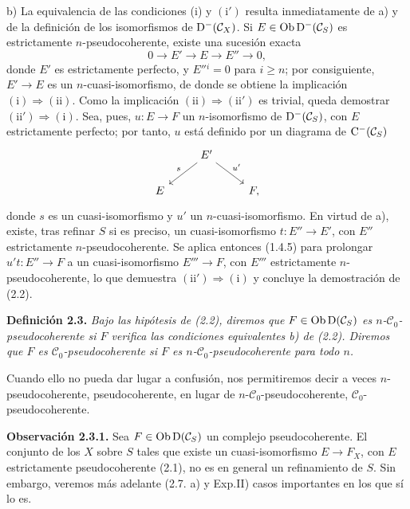 b) La equivalencia de las condiciones (i) y \((\mathrm{i}')\) resulta inmediatamente de a) y de la definición de los isomorfismos de \(\mathrm D^-(\mathcal C_X)\). Si \(E\in\operatorname{Ob}\mathrm D^-(\mathcal C_S)\) es estrictamente \(n\)-pseudocoherente, existe una sucesión exacta
\[
  0\longrightarrow E'\longrightarrow E\longrightarrow E''\longrightarrow 0,
\]
donde \(E'\) es estrictamente perfecto, y \(E''{}^i=0\) para \(i\geq n\); por consiguiente, \(E'\to E\) es un \(n\)-cuasi-isomorfismo, de donde se obtiene la implicación \((\mathrm{i})\Rightarrow(\mathrm{ii})\). Como la implicación \((\mathrm{ii})\Rightarrow(\mathrm{ii}')\) es trivial, queda demostrar \((\mathrm{ii}')\Rightarrow(\mathrm{i})\). Sea, pues, \(u:E\longrightarrow F\) un \(n\)-isomorfismo de \(\mathrm D^-(\mathcal C_S)\), con \(E\) estrictamente perfecto; por tanto, \(u\) está definido por un diagrama de \(\mathrm C^-(\mathcal C_S)\)
\[
\begin{tikzcd}
& E' \arrow[dl,"s"'] \arrow[dr,"u'"]\\
E && F ,
\end{tikzcd}
\]
donde \(s\) es un cuasi-isomorfismo y \(u'\) un \(n\)-cuasi-isomorfismo. En virtud de a), existe, tras refinar \(S\) si es preciso, un cuasi-isomorfismo \(t:E''\longrightarrow E'\), con \(E''\) estrictamente \(n\)-pseudocoherente. Se aplica entonces (1.4.5) para prolongar \(u't:E''\to F\) a un cuasi-isomorfismo \(E'''\longrightarrow F\), con \(E'''\) estrictamente \(n\)-pseudocoherente, lo que demuestra \((\mathrm{ii}')\Rightarrow(\mathrm{i})\) y concluye la demostración de (2.2).

\textbf{Definición 2.3.} \emph{Bajo las hipótesis de (2.2), diremos que \(F\in\operatorname{Ob}\mathrm D(\mathcal C_S)\) es \(n\)-\(\mathcal C_0\)-pseudocoherente si \(F\) verifica las condiciones equivalentes b) de (2.2). Diremos que \(F\) es \(\mathcal C_0\)-pseudocoherente si \(F\) es \(n\)-\(\mathcal C_0\)-pseudocoherente para todo \(n\).}

Cuando ello no pueda dar lugar a confusión, nos permitiremos decir a veces \(n\)-pseudocoherente, pseudocoherente, en lugar de \(n\)-\(\mathcal C_0\)-pseudocoherente, \(\mathcal C_0\)-pseudocoherente.

\textbf{Observación 2.3.1.} Sea \(F\in\operatorname{Ob}\mathrm D(\mathcal C_S)\) un complejo pseudocoherente. El conjunto de los \(X\) sobre \(S\) tales que existe un cuasi-isomorfismo \(E\longrightarrow F_X\), con \(E\) estrictamente pseudocoherente (2.1), no es en general un refinamiento de \(S\). Sin embargo, veremos más adelante (2.7. a) y Exp.II) casos importantes en los que sí lo es.

